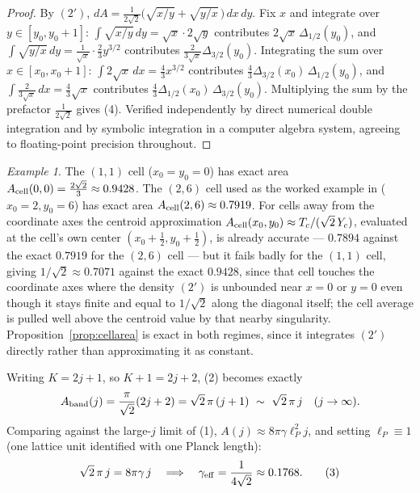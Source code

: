 \documentclass[11pt]{amsart}
\theoremstyle{remark}
\newtheorem*{example}{Example}
\begin{document}
\begin{proof}
By $(2')$, $dA=\frac1{2\sqrt2}\big(\sqrt{x/y}+\sqrt{y/x}\,\big)\,dx\,dy$. Fix $x$ and integrate over $y\in[y_0,y_0+1]$: $\int\sqrt{x/y}\,dy=\sqrt x\cdot2\sqrt y$ contributes $2\sqrt x\,\Delta_{1/2}(y_0)$, and $\int\sqrt{y/x}\,dy=\tfrac1{\sqrt x}\cdot\tfrac23y^{3/2}$ contributes $\tfrac2{3\sqrt x}\Delta_{3/2}(y_0)$. Integrating the sum over $x\in[x_0,x_0+1]$: $\int2\sqrt x\,dx=\tfrac43x^{3/2}$ contributes $\tfrac43\Delta_{3/2}(x_0)\,\Delta_{1/2}(y_0)$, and $\int\tfrac2{3\sqrt x}\,dx=\tfrac43\sqrt x$ contributes $\tfrac43\Delta_{1/2}(x_0)\,\Delta_{3/2}(y_0)$. Multiplying the sum by the prefactor $\tfrac1{2\sqrt2}$ gives (4). Verified independently by direct numerical double integration and by symbolic integration in a computer algebra system, agreeing to floating-point precision throughout.
\end{proof}

\begin{example}
The $(1,1)$ cell ($x_0=y_0=0$) has exact area $A_{\rm cell}(0,0)=\tfrac{2\sqrt2}3\approx0.9428$. The $(2,6)$ cell used as the worked example in \cite{Ebert2026} ($x_0=2,y_0=6$) has exact area $A_{\rm cell}(2,6)\approx0.7919$. For cells away from the coordinate axes the centroid approximation $A_{\rm cell}(x_0,y_0)\approx T_c/(\sqrt2\,Y_c)$, evaluated at the cell's own center $(x_0+\tfrac12,y_0+\tfrac12)$, is already accurate --- $0.7894$ against the exact $0.7919$ for the $(2,6)$ cell --- but it fails badly for the $(1,1)$ cell, giving $1/\sqrt2\approx0.7071$ against the exact $0.9428$, since that cell touches the coordinate axes where the density $(2')$ is unbounded near $x=0$ or $y=0$ even though it stays finite and equal to $1/\sqrt2$ along the diagonal itself; the cell average is pulled well above the centroid value by that nearby singularity. Proposition~\ref{prop:cellarea} is exact in both regimes, since it integrates $(2')$ directly rather than approximating it as constant.
\end{example}

Writing $K=2j+1$, so $K+1=2j+2$, (2) becomes exactly
\[
A_{\rm band}(j)=\frac{\pi}{\sqrt2}(2j+2)=\sqrt2\,\pi\,(j+1)\ \sim\ \sqrt2\,\pi\,j\quad(j\to\infty).
\]
Comparing against the large-$j$ limit of (1), $A(j)\approx8\pi\gamma\ell_P^2j$, and
setting $\ell_P\equiv1$ (one lattice unit identified with one Planck length):
\begin{equation}
\sqrt2\,\pi\,j = 8\pi\gamma\,j \quad\Longrightarrow\quad \gamma_{\rm eff}=\frac1{4\sqrt2}\approx0.1768. \tag{3}
\end{equation}
\end{document}
